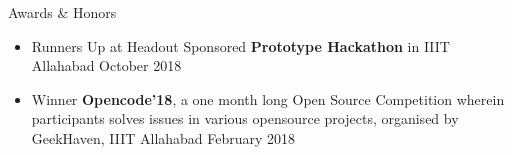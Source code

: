 \documentclass{resume} %
\begin{document}

\begin{rSection}{Awards \& Honors} \itemsep -2pt   

\begin{itemize}
 
\item Runners Up at Headout Sponsored \textbf{Prototype Hackathon} in IIIT Allahabad \hfill October 2018 
\item Winner \textbf{Opencode'18}, a one month long Open Source Competition wherein participants solves issues in various opensource projects, organised by GeekHaven, IIIT Allahabad \hfill February 2018
\end{itemize}  


\end{rSection} 
\end{document}
